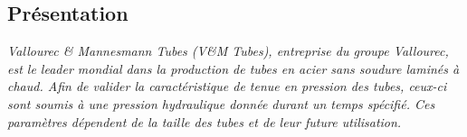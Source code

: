 \documentclass[10pt,fleqn]{article} %
\begin{document}

\vspace{4.4cm}
\pagestyle{fancy}
\thispagestyle{plain}

\def\columnseprulecolor{\color{ocre}}
\setlength{\columnseprule}{0.4pt} 

\def\pathfig{images}

\begin{multicols}{2}
\subsection*{Présentation}
\ifprof
\else
\footnotesize{\textit{
Vallourec \& Mannesmann Tubes (V\&M Tubes), entreprise du groupe Vallourec, est le leader mondial dans la production de tubes en acier sans soudure laminés à chaud. %
Afin de valider la caractéristique de tenue en pression des tubes, ceux-ci sont soumis à une pression hydraulique donnée durant un temps spécifié. Ces paramètres dépendent de la taille des tubes et de leur future utilisation.
}}


\end{multicols}
\end{document}
